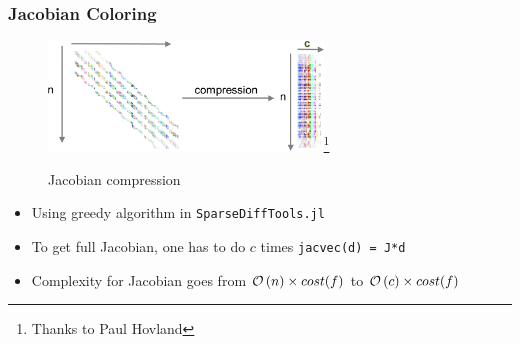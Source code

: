 \begin{frame}
  \frametitle{Jacobian Coloring}
  \begin{center}
    \begin{figure}
      \includegraphics[width=0.65\textwidth]{figures/compression}\footnote{Thanks to Paul Hovland}
      \caption{Jacobian compression}
    \end{figure}
  \end{center}
  \begin{itemize}
    \item Using greedy algorithm in \lstinline{SparseDiffTools.jl}
    \item To get full Jacobian, one has to do $c$ times \lstinline{jacvec(d) = J*d}
    \item Complexity for Jacobian goes from $\mathcal{O}\left( n \right) \times cost(f)$ to $\mathcal{O}\left( c \right) \times cost(f)$
  \end{itemize}
\end{frame}

